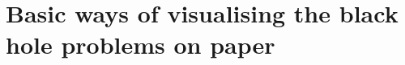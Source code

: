 \documentclass[english, a4, 12pt]{scrartcl}
\begin{document}
	
			
\section{Basic ways of visualising the black hole problems on paper}
	
	
	
			

		

	

 


	
	
	
	
	
	
	
	


	
	
\end{document}
